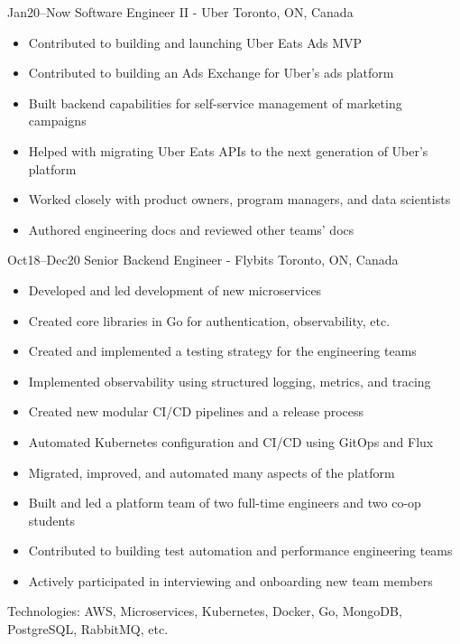 \documentclass[]{cv-style}                     %
\begin{document}
\begin{entrylist}

  \entry
  {\small Jan20--Now}
  {Software Engineer II - Uber}
  {Toronto, ON, Canada}
  {
    \begin{itemize}
      \item Contributed to building and launching Uber Eats Ads MVP
      \item Contributed to building an Ads Exchange for Uber's ads platform
      \item Built backend capabilities for self-service management of marketing campaigns
      \item Helped with migrating Uber Eats APIs to the next generation of Uber's platform
      \item Worked closely with product owners, program managers, and data scientists
      \item Authored engineering docs and reviewed other teams' docs
    \end{itemize}
  }

  \entry
  {\small Oct18--Dec20}
  {Senior Backend Engineer - Flybits}
  {Toronto, ON, Canada}
  {
    \begin{itemize}
      \item Developed and led development of new microservices
      \item Created core libraries in Go for authentication, observability, etc.
      \item Created and implemented a testing strategy for the engineering teams
      \item Implemented observability using structured logging, metrics, and tracing
      \item Created new modular CI/CD pipelines and a release process
      \item Automated Kubernetes configuration and CI/CD using GitOps and Flux
      \item Migrated, improved, and automated many aspects of the platform
      \item Built and led a platform team of two full-time engineers and two co-op students
      \item Contributed to building test automation and performance engineering teams
      \item Actively participated in interviewing and onboarding new team members
    \end{itemize}
    Technologies: AWS, Microservices, Kubernetes, Docker, Go, MongoDB, PostgreSQL, RabbitMQ, etc.
  }


\end{entrylist}
\end{document}
